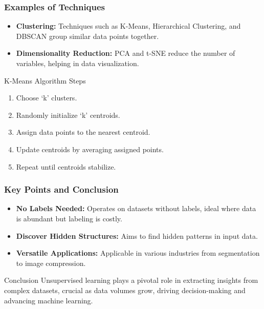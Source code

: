 \documentclass[aspectratio=169]{beamer}
\begin{document}
\begin{frame}[fragile]
    \frametitle{Examples of Techniques}
    
    \begin{itemize}
        \item \textbf{Clustering:} Techniques such as K-Means, Hierarchical Clustering, and DBSCAN group similar data points together. 
        \item \textbf{Dimensionality Reduction:} PCA and t-SNE reduce the number of variables, helping in data visualization.
    \end{itemize}
    
    \begin{block}{K-Means Algorithm Steps}
        \begin{enumerate}
            \item Choose ‘k’ clusters.
            \item Randomly initialize ‘k’ centroids.
            \item Assign data points to the nearest centroid.
            \item Update centroids by averaging assigned points.
            \item Repeat until centroids stabilize.
        \end{enumerate}
    \end{block}
\end{frame}

\begin{frame}[fragile]
    \frametitle{Key Points and Conclusion}
    
    \begin{itemize}
        \item \textbf{No Labels Needed:} Operates on datasets without labels, ideal where data is abundant but labeling is costly.
        \item \textbf{Discover Hidden Structures:} Aims to find hidden patterns in input data.
        \item \textbf{Versatile Applications:} Applicable in various industries from segmentation to image compression.
    \end{itemize}

    \begin{block}{Conclusion}
        Unsupervised learning plays a pivotal role in extracting insights from complex datasets, crucial as data volumes grow, driving decision-making and advancing machine learning.
    \end{block}
\end{frame}
\end{document}

